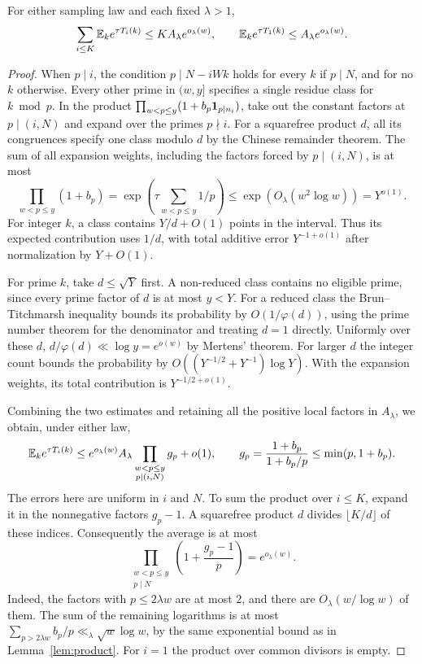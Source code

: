 \begin{lemma}\label{lem:moment}
For either sampling law and each fixed \(\lambda>1\),
\[
 \sum_{i\le K}\mathbb E_k e^{\tau T_i(k)}
       \le K A_\lambda e^{o_\lambda(w)},\qquad
 \mathbb E_k e^{\tau T_1(k)}\le A_\lambda e^{o_\lambda(w)}.
\]
\end{lemma}
\begin{proof}
When \(p\mid i\), the condition \(p\mid N-iWk\) holds for every \(k\)
if \(p\mid N\), and for no \(k\) otherwise. Every other prime in \((w,y]\)
specifies a single residue class for \(k\bmod p\). In the product
\(\prod_{w<p\le y}(1+b_p\mathbf 1_{p\mid n_i})\), take out the constant
factors at \(p\mid(i,N)\) and expand over the primes \(p\nmid i\).
For a squarefree product \(d\), all its congruences specify one class
modulo \(d\) by the Chinese remainder theorem. The sum of all expansion
weights, including the factors forced by \(p\mid(i,N)\), is at most
\[
 \prod_{w<p\le y}(1+b_p)
    =\exp\left(\tau\sum_{w<p\le y}1/p\right)
    \le \exp(O_\lambda(w^2\log w))=Y^{o(1)}.
\]
For integer \(k\), a class contains \(Y/d+O(1)\) points in the interval.
Thus its expected contribution uses \(1/d\), with total additive error
\(Y^{-1+o(1)}\) after normalization by \(Y+O(1)\).

For prime \(k\), take \(d\le\sqrt Y\) first. A non-reduced class
contains no eligible prime, since every prime factor of \(d\) is at most
\(y<Y\). For a reduced class the Brun--Titchmarsh inequality
\cite[Theorem~2, (1.10)]{MV} bounds its probability by
\(O(1/\varphi(d))\), using the prime number theorem for the denominator
and treating \(d=1\) directly. Uniformly over these \(d\),
\(d/\varphi(d)\ll\log y=e^{o(w)}\) by Mertens' theorem. For larger \(d\)
the integer count bounds the probability by
\(O((Y^{-1/2}+Y^{-1})\log Y)\). With the expansion weights, its total
contribution is \(Y^{-1/2+o(1)}\).

Combining the two estimates and retaining all the positive local factors
in \(A_\lambda\), we obtain, under either law,
\[
 \mathbb E_k e^{\tau T_i(k)}
   \le e^{o_\lambda(w)} A_\lambda
        \prod_{\substack{w<p\le y\\p\mid(i,N)}}g_p+o(1),
 \qquad g_p=\frac{1+b_p}{1+b_p/p}\le\min(p,1+b_p).
\]
The errors here are uniform in \(i\) and \(N\). To sum the product over
\(i\le K\), expand it in the nonnegative factors \(g_p-1\). A squarefree
product \(d\) divides \(\lfloor K/d\rfloor\) of these indices. Consequently
the average is at most
\[
 \prod_{\substack{w<p\le y\\p\mid N}}\left(1+\frac{g_p-1}{p}\right)
        =e^{o_\lambda(w)} .
\]
Indeed, the factors with \(p\le2\lambda w\) are at most \(2\), and there
are \(O_\lambda(w/\log w)\) of them. The sum of the remaining logarithms
is at most \(\sum_{p>2\lambda w} b_p/p\ll_\lambda \sqrt w\log w\),
by the same exponential bound as in Lemma~\ref{lem:product}. For \(i=1\)
the product over common divisors is empty.
\end{proof}

